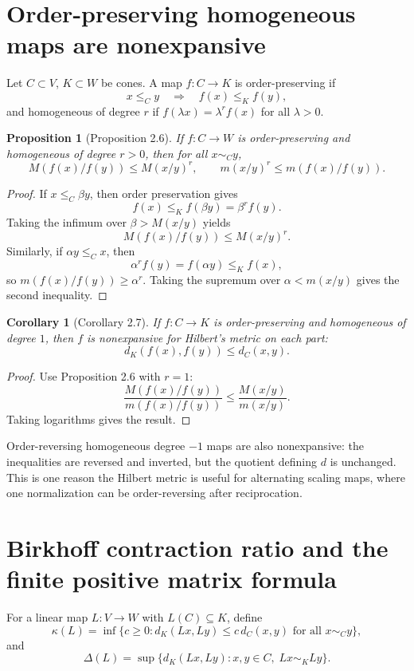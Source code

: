 \documentclass[11pt]{article}
\newtheorem{corollary}{Corollary}
\newtheorem{proposition}{Proposition}
\begin{document}
\section{Order-preserving homogeneous maps are nonexpansive}
Let \(C\subset V\), \(K\subset W\) be cones.  A map \(f:C\to K\) is order-preserving if
\[
  x\le_C y\quad\Longrightarrow\quad f(x)\le_K f(y),
\]
and homogeneous of degree \(r\) if \(f(\lambda x)=\lambda^r f(x)\) for all \(\lambda>0\).

\begin{proposition}[Proposition 2.6]
If \(f:C\to W\) is order-preserving and homogeneous of degree \(r>0\), then for all \(x\sim_C y\),
\[
  M(f(x)/f(y))\le M(x/y)^r,
  \qquad
  m(x/y)^r\le m(f(x)/f(y)).
\]
\end{proposition}

\begin{proof}
If \(x\le_C \beta y\), then order preservation gives
\[
  f(x)\le_K f(\beta y)=\beta^r f(y).
\]
Taking the infimum over \(\beta>M(x/y)\) yields
\[
  M(f(x)/f(y))\le M(x/y)^r.
\]
Similarly, if \(\alpha y\le_C x\), then
\[
  \alpha^r f(y)=f(\alpha y)\le_K f(x),
\]
so \(m(f(x)/f(y))\ge \alpha^r\).  Taking the supremum over \(\alpha<m(x/y)\) gives the second inequality.
\end{proof}

\begin{corollary}[Corollary 2.7]
If \(f:C\to K\) is order-preserving and homogeneous of degree \(1\), then \(f\) is nonexpansive for Hilbert's metric on each part:
\[
  d_K(f(x),f(y))\le d_C(x,y).
\]
\end{corollary}

\begin{proof}
Use Proposition 2.6 with \(r=1\):
\[
  \frac{M(f(x)/f(y))}{m(f(x)/f(y))}
  \le \frac{M(x/y)}{m(x/y)}.
\]
Taking logarithms gives the result.
\end{proof}

Order-reversing homogeneous degree \(-1\) maps are also nonexpansive: the inequalities are reversed and inverted, but the quotient defining \(d\) is unchanged.  This is one reason the Hilbert metric is useful for alternating scaling maps, where one normalization can be order-reversing after reciprocation.

\section{Birkhoff contraction ratio and the finite positive matrix formula}
For a linear map \(L:V\to W\) with \(L(C)\subseteq K\), define
\[
  \kappa(L)=\inf\{c\ge0:d_K(Lx,Ly)\le c\,d_C(x,y)\text{ for all }x\sim_C y\},
\]
and
\[
  \Delta(L)=\sup\{d_K(Lx,Ly):x,y\in C,\;Lx\sim_K Ly\}.
\]
\end{document}
